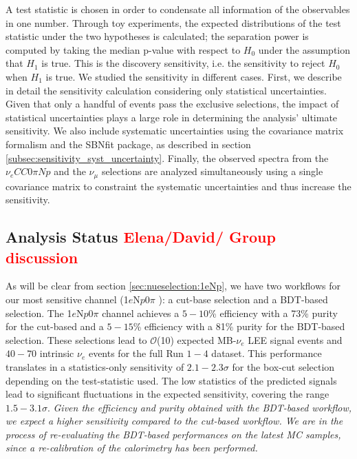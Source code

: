 \documentclass[a4paper]{article}
\newcommand{\nueccnopinp}{$\nu_e CC 0\pi Np$ }
\newcommand{\numu}{$\nu_{\mu}$ }
\newcommand{\npsel}{1$e$N$p$0$\pi$ }
\begin{document}
A test statistic is chosen in order to condensate all information of the observables in one number.
Through toy experiments, the expected distributions of the test statistic under the two hypotheses is calculated; the separation power is computed by taking the median p-value with respect to $H_0$ under the assumption that %
 $H_1$ is true. This is the discovery sensitivity, i.e. the sensitivity to reject $H_0$ when $H_1$ is true.
We studied the sensitivity in different cases. First, we describe in detail the sensitivity calculation considering only statistical uncertainties. Given that only a handful of events pass the exclusive selections, the impact of statistical uncertainties plays a large role in determining the analysis' ultimate sensitivity. We also include systematic uncertainties using the covariance matrix formalism and the SBNfit package, as described in section \ref{subsec:sensitivity_syst_uncertainty}.
Finally, the observed spectra from the \nueccnopinp and the \numu selections are analyzed simultaneously using a single covariance matrix to constraint the systematic uncertainties and thus increase the sensitivity.

\subsection{Analysis Status \textcolor{red}{Elena/David/ Group discussion}}

\par As will be clear from section \ref{sec:nueselection:1eNp}, we have two workflows for our most sensitive channel (\npsel): a cut-base selection and a BDT-based selection.  The \npsel channel achieves a $5-10$\% efficiency with a 73\%  purity for the cut-based  and a $5-15$\% efficiency with a 81\%  purity for the BDT-based selection. These selections lead to $\mathcal{O}$(10) expected MB-$\nu_e$ LEE signal events and $40-70$ intrinsic $\nu_e$ events for the full Run $1-4$ dataset. This performance translates in a statistics-only sensitivity of $2.1-2.3\sigma$ for the box-cut selection depending on the test-statistic used. The low statistics of the predicted signals lead to significant fluctuations in the expected sensitivity, covering the range $1.5-3.1\sigma$. 
 \emph{Given the efficiency and purity obtained with the BDT-based workflow, we expect a higher sensitivity compared to the cut-based workflow.  We are in the process of re-evaluating the BDT-based performances on the latest MC samples, since  a re-calibration of the calorimetry has been performed.} 
\end{document}

